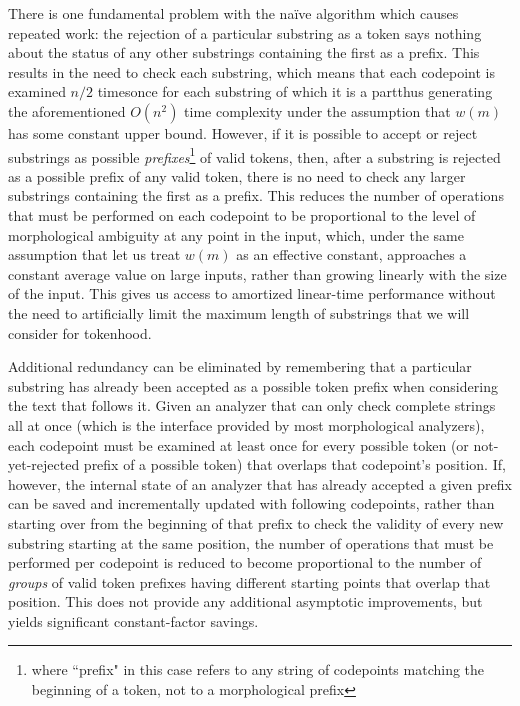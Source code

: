 There is one fundamental problem with the na\"ive algorithm which causes repeated work: the rejection of a particular substring as a token says nothing about the status of any other substrings containing the first as a prefix. This results in the need to check each substring, which means that each codepoint is examined $n/2$ times\textemdash once for each substring of which it is a part\textemdash thus generating the aforementioned $O(n^{2})$ time complexity under the assumption that $w(m)$ has some constant upper bound. However, if it is possible to accept or reject substrings as possible \textit{prefixes}\footnote{where ``prefix" in this case refers to any string of codepoints matching the beginning of a token, not to a morphological prefix} of valid tokens, then, after a substring is rejected as a possible prefix of any valid token, there is no need to check any larger substrings containing the first as a prefix. This reduces the number of operations that must be performed on each codepoint to be proportional to the level of morphological ambiguity at any point in the input, which, under the same assumption that let us treat $w(m)$ as an effective constant, approaches a constant average value on large inputs, rather than growing linearly with the size of the input. This gives us access to amortized linear-time performance without the need to artificially limit the maximum length of substrings that we will consider for tokenhood.

Additional redundancy can be eliminated by remembering that a particular substring has already been accepted as a possible token prefix when considering the text that follows it. Given an analyzer that can only check complete strings all at once (which is the interface provided by most morphological analyzers), each codepoint must be examined at least once for every possible token (or not-yet-rejected prefix of a possible token) that overlaps that codepoint's position. If, however, the internal state of an analyzer that has already accepted a given prefix can be saved and incrementally updated with following codepoints, rather than starting over from the beginning of that prefix to check the validity of every new substring starting at the same position, the number of operations that must be performed per codepoint is reduced to become proportional to the number of \textit{groups} of valid token prefixes having different starting points that overlap that position. This does not provide any additional asymptotic improvements, but yields significant constant-factor savings.

